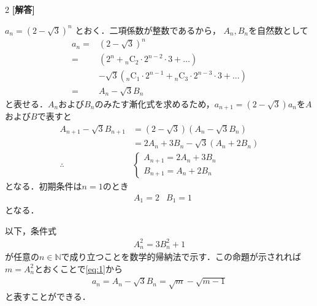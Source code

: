 \documentclass[../../main.tex]{subfiles}
\begin{document}
\setcounter{equation}{0}
\setcounter{figure}{0}
\setcounter{table}{0}
\begin{oframed}
  
\end{oframed}
\setlength{\columnseprule}{0.4pt}
\begin{multicols}{2}
  {\bf [解答]}

  $a_n = (2-\sqrt{3})^n$ とおく．二項係数が整数であるから，
  $A_n, B_n$を自然数として
  \begin{align}
    a_n
    = & (2-\sqrt{3})^n                                                                             \\
    = & (2^n + {}_n\mathrm{C}_2 \cdot 2^{n-2} \cdot 3 + \dots)                                     \\
    & -\sqrt{3}({}_n\mathrm{C}_1 \cdot 2^{n-1} + {}_n\mathrm{C}_3 \cdot 2^{n-3} \cdot 3 + \dots) \\
    = & A_n - \sqrt{3}B_n \label{eq:1}
  \end{align}
  と表せる．$A_n$および$B_n$のみたす漸化式を求めるため，$a_{n+1}=(2-\sqrt{3})a_{n}$を$A$および$B$で表すと
  \begin{align}
    A_{n+1} - \sqrt{3}B_{n+1}
    & = (2-\sqrt{3})(A_n - \sqrt{3}B_n)    \\
    & = 2A_n + 3B_n - \sqrt{3}(A_n + 2B_n) \\
    \therefore &
    \begin{cases}
      A_{n+1} = 2A_n+ 3B_n \\
      B_{n+1} = A_n + 2B_n
    \end{cases} \label{eq:2}
  \end{align}
  となる．初期条件は$n=1$のとき
  \begin{align}
    & A_{1} = 2 & B_{1} = 1 \label{eq:3}
  \end{align}
  となる．

  以下，条件式
  \begin{align}
    A_n^2 = 3B_n^2 + 1 \label{eq:4}
  \end{align}
  が任意の$n \in \mathbb{N}$で成り立つことを数学的帰納法で示す．この命題が示されれば$m=A_{n}^2$とおくことで\cref{eq:1}から
  \begin{align}
    a_n = A_n - \sqrt{3}B_n = \sqrt{m} - \sqrt{m-1}
  \end{align}
  と表すことができる．


\end{multicols}
\end{document}
